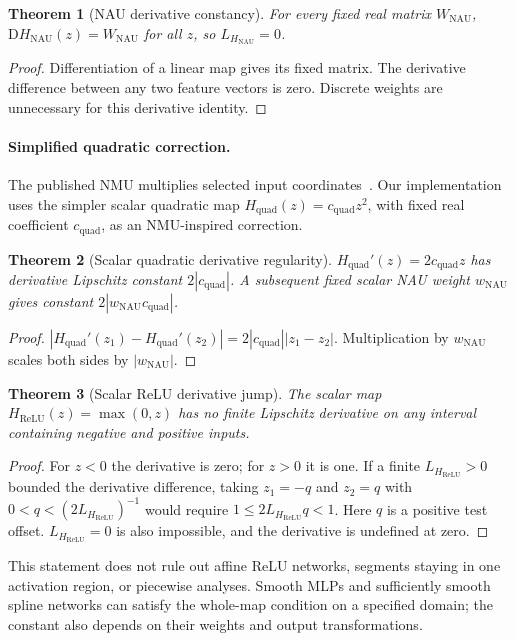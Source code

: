 \documentclass[10pt]{article}
\newtheorem{theorem}{Theorem}[section]
\begin{document}
\begin{theorem}[NAU derivative constancy]
\label{thm:nau_const}
For every fixed real matrix $W_{\mathrm{NAU}}$,
$\mathrm{D}H_{\mathrm{NAU}}(z)=W_{\mathrm{NAU}}$ for all $z$, so
$L_{H_{\mathrm{NAU}}}=0$.
\end{theorem}
\begin{proof}
Differentiation of a linear map gives its fixed matrix. The derivative difference between any two feature vectors is zero. Discrete weights are unnecessary for this derivative identity.
\end{proof}

\paragraph{Simplified quadratic correction.}
The published NMU multiplies selected input coordinates~\cite{Madsen2020NAU}. Our implementation uses the simpler scalar quadratic map
$H_{\mathrm{quad}}(z)=c_{\mathrm{quad}}z^2$, with fixed real coefficient $c_{\mathrm{quad}}$, as an NMU-inspired correction.

\begin{theorem}[Scalar quadratic derivative regularity]
\label{thm:nmu_bias}
$H_{\mathrm{quad}}'(z)=2c_{\mathrm{quad}}z$ has derivative Lipschitz constant $2|c_{\mathrm{quad}}|$.
A subsequent fixed scalar NAU weight $w_{\mathrm{NAU}}$ gives constant $2|w_{\mathrm{NAU}}c_{\mathrm{quad}}|$.
\end{theorem}
\begin{proof}
$|H_{\mathrm{quad}}'(z_1)-H_{\mathrm{quad}}'(z_2)|
=2|c_{\mathrm{quad}}||z_1-z_2|$. Multiplication by $w_{\mathrm{NAU}}$ scales both sides by $|w_{\mathrm{NAU}}|$.
\end{proof}

\begin{theorem}[Scalar ReLU derivative jump]
\label{thm:relu_impossible}
The scalar map $H_{\mathrm{ReLU}}(z)=\max(0,z)$ has no finite Lipschitz derivative on any interval containing negative and positive inputs.
\end{theorem}
\begin{proof}
For $z<0$ the derivative is zero; for $z>0$ it is one. If a finite $L_{H_{\mathrm{ReLU}}}>0$ bounded the derivative difference, taking
$z_1=-q$ and $z_2=q$ with $0<q<(2L_{H_{\mathrm{ReLU}}})^{-1}$
would require $1\leq2L_{H_{\mathrm{ReLU}}}q<1$.
Here $q$ is a positive test offset. $L_{H_{\mathrm{ReLU}}}=0$ is also impossible, and the derivative is undefined at zero.
\end{proof}
This statement does not rule out affine ReLU networks, segments staying in one activation region, or piecewise analyses. Smooth MLPs and sufficiently smooth spline networks can satisfy the whole-map condition on a specified domain; the constant also depends on their weights and output transformations.
\end{document}
